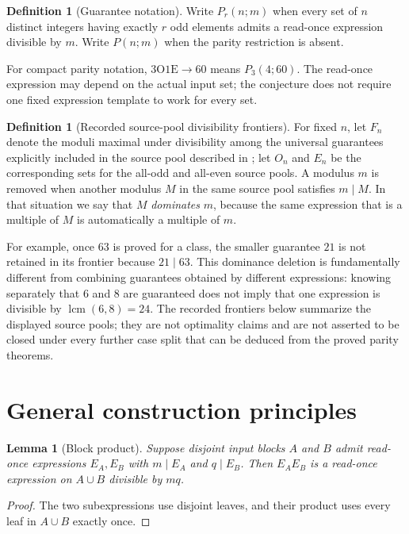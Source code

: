 \documentclass[11pt]{amsart}
\newtheorem{lemma}[theorem]{Lemma}
\theoremstyle{definition}
\newtheorem{definition}[theorem]{Definition}
\theoremstyle{remark}
\newcommand{\OO}{\mathrm O}
\newcommand{\EE}{\mathrm E}
\begin{document}
\begin{definition}[Guarantee notation]
Write $P_r(n;m)$ when every set of $n$ distinct integers having exactly $r$
odd elements admits a read-once expression divisible by $m$.  Write
$P(n;m)$ when the parity restriction is absent.
\end{definition}

For compact parity notation, $3\OO1\EE\to60$ means $P_3(4;60)$.  The
read-once expression may depend on the actual input set; the conjecture does
not require one fixed expression template to work for every set.

\begin{definition}[Recorded source-pool divisibility frontiers]
For fixed $n$, let $F_n$ denote the moduli maximal under divisibility among
the universal guarantees explicitly included in the source pool described in
; let $O_n$ and $E_n$ be the corresponding sets for the
all-odd and all-even source pools.  A modulus $m$ is removed when another
modulus $M$ in the same source pool satisfies $m\mid M$.  In that situation
we say that $M$ \emph{dominates} $m$, because the same expression that is a
multiple of $M$ is automatically a multiple of $m$.
\end{definition}

For example, once $63$ is proved for a class, the smaller guarantee $21$ is
not retained in its frontier because $21\mid63$.  This dominance deletion is
fundamentally different from combining guarantees obtained by different
expressions: knowing separately that $6$ and $8$ are guaranteed does not imply
that one expression is divisible by $\operatorname{lcm}(6,8)=24$.  The
recorded frontiers below summarize the displayed source pools; they are not
optimality claims and are not asserted to be closed under every further case
split that can be deduced from the proved parity theorems.

\section{General construction principles}

\begin{lemma}[Block product]\label{lem:block}
Suppose disjoint input blocks $A$ and $B$ admit read-once expressions
$E_A,E_B$ with $m\mid E_A$ and $q\mid E_B$.  Then $E_AE_B$ is a read-once
expression on $A\cup B$ divisible by $mq$.
\end{lemma}
\begin{proof}
The two subexpressions use disjoint leaves, and their product uses every leaf
in $A\cup B$ exactly once.
\end{proof}
\end{document}
